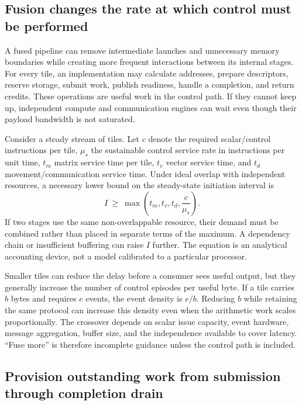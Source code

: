 \subsection{Fusion changes the rate at which control must be performed}

A fused pipeline can remove intermediate launches and unnecessary memory boundaries while creating more frequent interactions between its internal stages. For every tile, an implementation may calculate addresses, prepare descriptors, reserve storage, submit work, publish readiness, handle a completion, and return credits. These operations are useful work in the control path. If they cannot keep up, independent compute and communication engines can wait even though their payload bandwidth is not saturated.

Consider a steady stream of tiles. Let $c$ denote the required scalar/control instructions per tile, $\mu_s$ the sustainable control service rate in instructions per unit time, $t_m$ matrix service time per tile, $t_v$ vector service time, and $t_d$ movement/communication service time. Under ideal overlap with independent resources, a necessary lower bound on the steady-state initiation interval is
\begin{equation}
 I\ \geq\ \max\left(t_m,t_v,t_d,\frac{c}{\mu_s}\right).
 \label{eq:u006-control}
\end{equation}
If two stages use the same non-overlappable resource, their demand must be combined rather than placed in separate terms of the maximum. A dependency chain or insufficient buffering can raise $I$ further. The equation is an analytical accounting device, not a model calibrated to a particular processor.

Smaller tiles can reduce the delay before a consumer sees useful output, but they generally increase the number of control episodes per useful byte. If a tile carries $b$ bytes and requires $e$ events, the event density is $e/b$. Reducing $b$ while retaining the same protocol can increase this density even when the arithmetic work scales proportionally. The crossover depends on scalar issue capacity, event hardware, message aggregation, buffer size, and the independence available to cover latency. ``Fuse more'' is therefore incomplete guidance unless the control path is included.

\subsection{Provision outstanding work from submission through completion drain}

